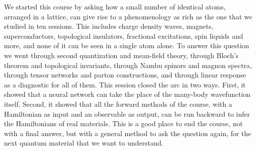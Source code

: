 We started this course by asking how a small number of identical atoms, arranged in a lattice, can
give rise to a phenomenology as rich as the one that we studied in ten sessions. This includes
charge density waves, magnets, superconductors, topological insulators, fractional excitations,
spin liquids and more, and none of it can be seen in a single atom alone. To answer this question we
went through second quantization and mean-field theory, through Bloch's theorem and topological
invariants, through Nambu spinors and magnon spectra, through tensor networks and parton
constructions, and through linear response as a diagnostic for all of them. This session closed
the arc in two ways. First, it showed that a neural network can take the place of the many-body
wavefunction itself. Second, it showed that all the forward methods of the course, with a
Hamiltonian as input and an observable as output, can be run backward to infer the Hamiltonians of
real materials. This is a good place to end the course, not with a final answer, but with a general
method to ask the question again, for the next quantum material that we want to understand.
